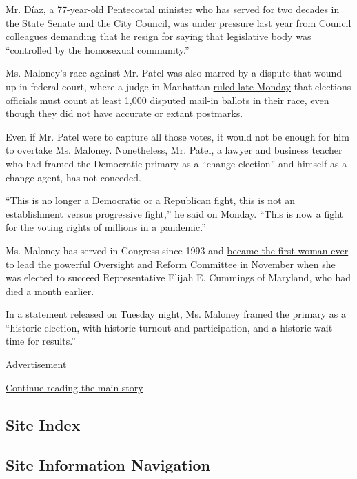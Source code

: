 Mr. Díaz, a 77-year-old Pentecostal minister who has served for two
decades in the State Senate and the City Council, was under pressure
last year from Council colleagues demanding that he resign for saying
that legislative body was ``controlled by the homosexual community.''

Ms. Maloney's race against Mr. Patel was also marred by a dispute that
wound up in federal court, where a judge in Manhattan
\href{https://www.nytimes.com/2020/08/03/nyregion/nyc-congress-carolyn-maloney-ballots.html}{ruled
late Monday} that elections officials must count at least 1,000 disputed
mail-in ballots in their race, even though they did not have accurate or
extant postmarks.

Even if Mr. Patel were to capture all those votes, it would not be
enough for him to overtake Ms. Maloney. Nonetheless, Mr. Patel, a lawyer
and business teacher who had framed the Democratic primary as a ``change
election'' and himself as a change agent, has not conceded.

``This is no longer a Democratic or a Republican fight, this is not an
establishment versus progressive fight,'' he said on Monday. ``This is
now a fight for the voting rights of millions in a pandemic.''

Ms. Maloney has served in Congress since 1993 and
\href{https://www.nytimes.com/2019/11/20/us/politics/carolyn-maloney-oversight-committee.html}{became
the first woman ever to lead the powerful Oversight and Reform
Committee} in November when she was elected to succeed Representative
Elijah E. Cummings of Maryland, who had
\href{https://www.nytimes.com/2019/10/17/us/politics/elijah-cummings-death-illness.html}{died
a month earlier}.

In a statement released on Tuesday night, Ms. Maloney framed the primary
as a ``historic election, with historic turnout and participation, and a
historic wait time for results.''

Advertisement

\protect\hyperlink{after-bottom}{Continue reading the main story}

\hypertarget{site-index}{%
\subsection{Site Index}\label{site-index}}

\hypertarget{site-information-navigation}{%
\subsection{Site Information
Navigation}\label{site-information-navigation}}

